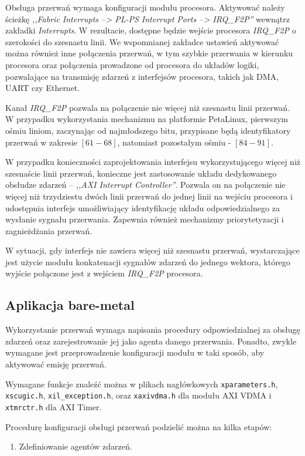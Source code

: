 {Obsługa przerwań wymaga konfiguracji modułu procesora. Aktywować należy ścieżkę \emph{,,Fabric Interrupts --> PL-PS Interrupt Ports --> IRQ\_F2P''} wewnątrz zakładki \emph{Interrupts}. W rezultacie, dostępne będzie wejście procesora \emph{IRQ\_F2P} o szerokości do szesnastu linii. We wspomnianej zakładce ustawień aktywować można również inne połączenia przerwań, w tym szybkie przerwania w kierunku procesora oraz połączenia prowadzone od procesora do układów logiki, pozwalające na transmisję zdarzeń z interfejsów procesora, takich jak DMA, UART czy Ethernet.

Kanał \emph{IRQ\_F2P} pozwala na połączenie nie więcej niż szesnastu linii przerwań. W przypadku wykorzystania mechanizmu na platformie PetaLinux, pierwszym ośmiu liniom, zaczynając od najmłodszego bitu, przypisane będą identyfikatory przerwań w zakresie $[61-68]$, natomiast pozostałym ośmiu - $[84-91]$.

W przypadku konieczności zaprojektowania interfejsu wykorzystującego więcej niż szesnaście linii przerwań, konieczne jest zastosowanie układu dedykowanego obsłudze zdarzeń -- \emph{,,AXI Interrupt Controller''}. Pozwala on na połączenie nie więcej niż trzydziestu dwóch linii przerwań do jednej linii na wejściu procesora i udostępnia interfejs umożliwiający identyfikację układu odpowiedzialnego za wysłanie sygnału przerwania. Zapewnia również mechanizmy priorytetyzacji i zagnieżdżania przerwań.

W sytuacji, gdy interfejs nie zawiera więcej niż szesnastu przerwań, wystarczające jest użycie modułu konkatenacji sygnałów zdarzeń do jednego wektora, którego wyjście połączone jest z wejściem \emph{IRQ\_F2P} procesora.

\subsection{Aplikacja bare-metal}
Wykorzystanie przerwań wymaga napisania procedury odpowiedzialnej za obsługę zdarzeń oraz zarejestrowanie jej jako agenta danego przerwania. Ponadto, zwykle wymagane jest przeprowadzenie konfiguracji modułu w taki sposób, aby aktywować emisję przerwań.

Wymagane funkcje znaleźć można w plikach nagłówkowych \texttt{xparameters.h}, \texttt{xscugic.h}, \texttt{xil\_exception.h}, oraz \texttt{xaxivdma.h} dla modułu AXI VDMA i \texttt{xtmrctr.h} dla AXI Timer.

Procedurę konfiguracji obsługi przerwań podzielić można na kilka etapów:
\begin{enumerate}
	\item Zdefiniowanie agentów zdarzeń.
	

\end{enumerate}}
